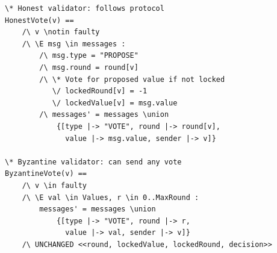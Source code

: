 \begin{lstlisting}[language=TLA,caption={Byzantine behavior model}]
\* Honest validator: follows protocol
HonestVote(v) ==
    /\ v \notin faulty
    /\ \E msg \in messages :
        /\ msg.type = "PROPOSE"
        /\ msg.round = round[v]
        /\ \* Vote for proposed value if not locked
           \/ lockedRound[v] = -1
           \/ lockedValue[v] = msg.value
        /\ messages' = messages \union
            {[type |-> "VOTE", round |-> round[v],
              value |-> msg.value, sender |-> v]}

\* Byzantine validator: can send any vote
ByzantineVote(v) ==
    /\ v \in faulty
    /\ \E val \in Values, r \in 0..MaxRound :
        messages' = messages \union
            {[type |-> "VOTE", round |-> r,
              value |-> val, sender |-> v]}
    /\ UNCHANGED <<round, lockedValue, lockedRound, decision>>
\end{lstlisting}

